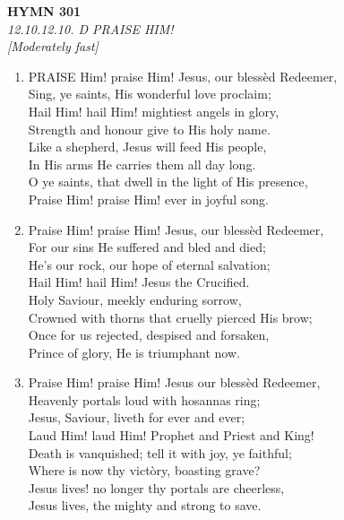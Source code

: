 \newpage
\begin{center}
    {\Large \textbf{HYMN 301}}
    \\
    \textit{12.10.12.10. D PRAISE HIM!}
    \\
    \textit{\small [Moderately fast]}
\end{center}
\vspace{1em}

\begin{enumerate}
    \item PRAISE Him! praise Him! Jesus, our bless\`ed Redeemer, \\
        Sing, ye saints, His wonderful love proclaim; \\
        Hail Him! hail Him! mightiest angels in glory, \\
        Strength and honour give to His holy name. \\
        Like a shepherd, Jesus will feed His people, \\
        In His arms He carries them all day long. \\
        O ye saints, that dwell in the light of His presence, \\
        Praise Him! praise Him! ever in joyful song.

    \item Praise Him! praise Him! Jesus, our bless\`ed Redeemer, \\
        For our sins He suffered and bled and died; \\
        He's our rock, our hope of eternal salvation; \\
        Hail Him! hail Him! Jesus the Crucified. \\
        Holy Saviour, meekly enduring sorrow, \\
        Crowned with thorns that cruelly pierced His brow; \\
        Once for us rejected, despised and forsaken, \\
        Prince of glory, He is triumphant now.

    \item Praise Him! praise Him! Jesus our bless\`ed Redeemer, \\
        Heavenly portals loud with hosannas ring; \\
        Jesus, Saviour, liveth for ever and ever; \\
        Laud Him! laud Him! Prophet and Priest and King! \\
        Death is vanquished; tell it with joy, ye faithful; \\
        Where is now thy vict\`ory, boasting grave? \\
        Jesus lives! no longer thy portals are cheerless, \\
        Jesus lives, the mighty and strong to save.

\end{enumerate}

